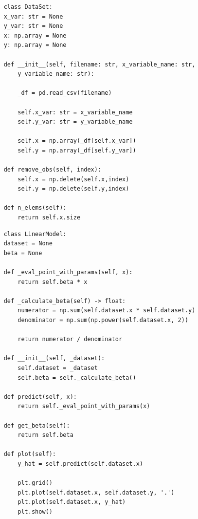 \documentclass{report}
\begin{document}
    \subtitle{Representaci\'on del dataset}
    \begin{lstlisting}
    class DataSet:
    x_var: str = None
    y_var: str = None
    x: np.array = None
    y: np.array = None

    def __init__(self, filename: str, x_variable_name: str,
        y_variable_name: str):

        _df = pd.read_csv(filename)

        self.x_var: str = x_variable_name
        self.y_var: str = y_variable_name

        self.x = np.array(_df[self.x_var])
        self.y = np.array(_df[self.y_var])

    def remove_obs(self, index):
        self.x = np.delete(self.x,index)
        self.y = np.delete(self.y,index)

    def n_elems(self):
        return self.x.size
    \end{lstlisting}

    \subtitle{Modelos}
    \begin{lstlisting}
    class LinearModel:
    dataset = None
    beta = None

    def _eval_point_with_params(self, x):
        return self.beta * x

    def _calculate_beta(self) -> float:
        numerator = np.sum(self.dataset.x * self.dataset.y)
        denominator = np.sum(np.power(self.dataset.x, 2))

        return numerator / denominator

    def __init__(self, _dataset):
        self.dataset = _dataset
        self.beta = self._calculate_beta()

    def predict(self, x):
        return self._eval_point_with_params(x)

    def get_beta(self):
        return self.beta

    def plot(self):
        y_hat = self.predict(self.dataset.x)

        plt.grid()
        plt.plot(self.dataset.x, self.dataset.y, '.')
        plt.plot(self.dataset.x, y_hat)
        plt.show()
    \end{lstlisting}
\end{document}

